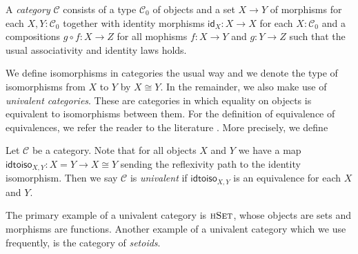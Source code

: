 \documentclass[9pt]{entcs}
\newcommand{\type}[1]{\textsc{#1}}
\newcommand{\function}[1]{\mathsf{#1}}
\newcommand{\morphism}[1]{\mathsf{#1}}
\newcommand{\hset}{\type{hSet}} %
\newcommand{\0}{\textbf{0}} %
\newcommand{\idm}[1]{\morphism{id}_{#1}} %
\newcommand{\compm}[2]{#2 \circ #1} %
\newcommand{\iso}[2]{#1 \cong #2} %
\newcommand{\idtoiso}{\function{idtoiso}} %
\newcommand{\remove}[1]{} %
\begin{document}
\begin{definition}
\label{def:cat}
A \emph{category} $\mathcal{C}$ consists of a type $\mathcal{C}_0$ of objects and a set $X \rightarrow Y$ of morphisms for each $X, Y : \mathcal{C}_0$ together with identity morphisms $\idm{X} : X \rightarrow X$ for each $X : \mathcal{C}_0$ and a compositions $\compm{f}{g} : X \rightarrow Z$ for all mophisms $f : X \rightarrow Y$ and $g : Y \rightarrow Z$ such that the usual associativity and identity laws holds.
\end{definition}

\remove{
\begin{definition}
A \emph{category} $\mathcal{C}$ consists of
\begin{itemize}
	\item a type $\mathcal{C}_0$ of objects;
	\item for each $X, Y : \mathcal{C}_0$ a set $X \rightarrow Y$ of morphisms;
	\item for each $X : \mathcal{C}_0$ a morphisms $\idm{X}$;
	\item for all objects $X, Y, Z : \mathcal{C}_0$ and morphisms $f : X \rightarrow Y$ and $g : Y \rightarrow Z$, a morphism $\compm{f}{g} : X \rightarrow Z$
\end{itemize}
such that the usual associativity and identity laws holds.
\end{definition}
}

We define isomorphisms in categories the usual way and we denote the type of isomorphisms from $X$ to $Y$ by $\iso{X}{Y}$.
In the remainder, we also make use of \emph{univalent categories}.
These are categories in which equality on objects is equivalent to isomorphisms between them.
For the definition of equivalence of equivalences, we refer the reader to the literature \cite{hottbook}.
More precisely, we define

\begin{definition}
\label{def:univalent}
Let $\mathcal{C}$ be a category.
Note that for all objects $X$ and $Y$ we have a map $\idtoiso_{X,Y} : X = Y \rightarrow \iso{X}{Y}$ sending the reflexivity path to the identity isomorphism.
Then we say $\mathcal{C}$ is \emph{univalent} if $\idtoiso_{X,Y}$ is an equivalence for each $X$ and $Y$.
\end{definition}

The primary example of a univalent category is $\hset$, whose objects are sets and morphisms are functions.
Another example of a univalent category which we use frequently, is the category of \emph{setoids}.
\end{document}
